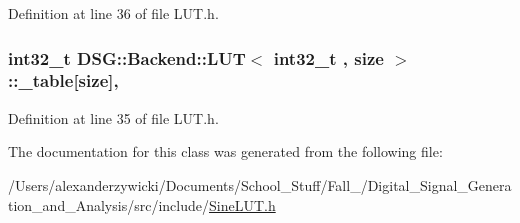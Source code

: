 Definition at line 36 of file L\+U\+T.\+h.

\hypertarget{classDSG_1_1Backend_1_1LUT_a23615428e84d6be4424c8b897866f253}{
\subsubsection[{\+\_\+table}]{\setlength{\rightskip}{0pt plus 5cm}int32\+\_\+t  {\bf D\+S\+G\+::\+Backend\+::\+L\+U\+T}$<$ int32\+\_\+t , size $>$\+::\+\_\+table\mbox{[}size\mbox{]}\hspace{0.3cm}{\ttfamily [protected]}, {\ttfamily [inherited]}}}\label{classDSG_1_1Backend_1_1LUT_a23615428e84d6be4424c8b897866f253}


Definition at line 35 of file L\+U\+T.\+h.



The documentation for this class was generated from the following file\+:\begin{DoxyCompactItemize}
\item 
/\+Users/alexanderzywicki/\+Documents/\+School\+\_\+\+Stuff/\+Fall\+\_/\+Digital\+\_\+\+Signal\+\_\+\+Generation\+\_\+and\+\_\+\+Analysis/src/include/\hyperlink{SineLUT_8h}{Sine\+L\+U\+T.\+h}\end{DoxyCompactItemize}
